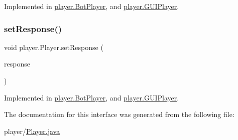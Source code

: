 Implemented in \mbox{\hyperlink{classplayer_1_1_bot_player_a716f0bd1509ca717defac662e8a3bb27}{player.\+Bot\+Player}}, and \mbox{\hyperlink{classplayer_1_1_g_u_i_player_a1e0814130235ac601f2817932e1fd195}{player.\+G\+U\+I\+Player}}.

\mbox{\label{interfaceplayer_1_1_player_af07ff250619f6dabf201ee2e2f488a4f}} 
\subsubsection{\texorpdfstring{set\+Response()}{setResponse()}}
{\footnotesize\ttfamily void player.\+Player.\+set\+Response (\begin{DoxyParamCaption}\item[{\mbox{\hyperlink{classui_1_1_game_response}{Game\+Response}}}]{response }\end{DoxyParamCaption})}



Implemented in \mbox{\hyperlink{classplayer_1_1_bot_player_a4b71aed2b100f4edd770bb1a0c4f7de9}{player.\+Bot\+Player}}, and \mbox{\hyperlink{classplayer_1_1_g_u_i_player_aaaa7d3f93324b2bef898fa2b6c3da8bd}{player.\+G\+U\+I\+Player}}.



The documentation for this interface was generated from the following file\+:\begin{DoxyCompactItemize}
\item 
player/\mbox{\hyperlink{_player_8java}{Player.\+java}}\end{DoxyCompactItemize}
